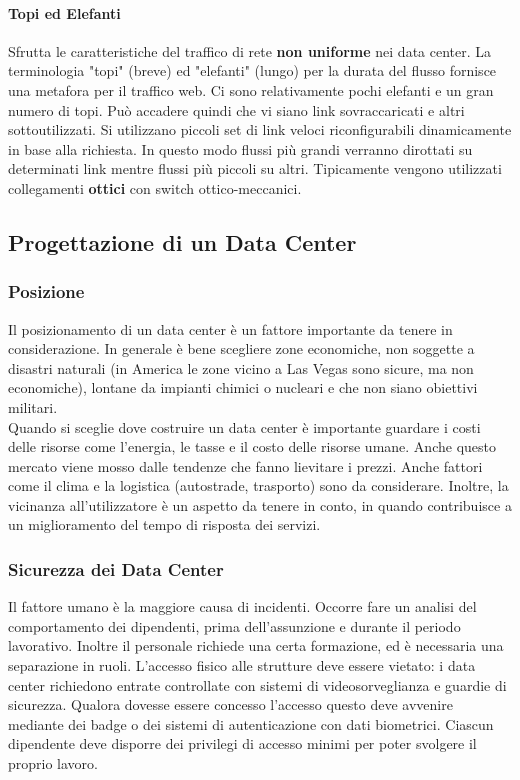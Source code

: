 \documentclass{article}
\begin{document}
		\paragraph{Topi ed Elefanti}\label{topi-e-elefanti}
		Sfrutta le caratteristiche del traffico di rete \textbf{non uniforme} nei data center.
		La terminologia "topi" (breve) ed "elefanti" (lungo) per la durata del flusso fornisce una metafora per il traffico web. Ci sono relativamente pochi elefanti e un gran numero di topi.
		Può accadere quindi che vi siano link sovraccaricati e altri sottoutilizzati. Si utilizzano piccoli set di link veloci riconfigurabili dinamicamente in base alla richiesta. In questo modo flussi più grandi verranno dirottati su determinati link mentre flussi più piccoli su altri. Tipicamente vengono utilizzati collegamenti \textbf{ottici} con switch ottico-meccanici.
		
		\subsection{Progettazione di un Data Center}\label{progettazione-di-un-data-center}
		\subsubsection{Posizione}\label{posizione}
		
		Il posizionamento di un data center è un fattore importante da
		tenere in considerazione. In generale è bene scegliere
		zone economiche, non soggette a disastri naturali (in America le zone vicino a Las Vegas sono	sicure, ma non economiche), lontane da impianti	chimici o nucleari e che non siano obiettivi militari.\\
		Quando si sceglie dove costruire un data center è importante guardare i costi delle risorse come	l'energia, le tasse e il
		costo delle risorse umane. Anche questo mercato	viene mosso dalle tendenze che fanno lievitare i prezzi. Anche fattori come il clima e la logistica (autostrade, trasporto) sono da considerare. Inoltre, la vicinanza all'utilizzatore è un aspetto da tenere in conto, in quando contribuisce a un
		miglioramento del tempo di risposta dei servizi.
		
		\subsubsection{Sicurezza dei Data Center}\label{sicurezza-dei-data-center}
		Il fattore umano è la maggiore causa di incidenti. Occorre fare un analisi del comportamento dei dipendenti, prima dell'assunzione e durante il periodo lavorativo. Inoltre il personale richiede una certa formazione, ed è necessaria una separazione in ruoli. L'accesso	fisico alle strutture deve essere vietato: i data center richiedono entrate controllate con
		sistemi di videosorveglianza e guardie di sicurezza. Qualora dovesse essere concesso l'accesso questo deve avvenire mediante dei badge o dei sistemi di autenticazione con dati biometrici.
		Ciascun dipendente deve disporre dei privilegi di accesso minimi per poter svolgere il proprio lavoro.
		
\end{document}
